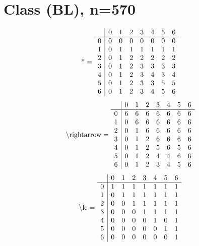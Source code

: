 \documentclass[11pt]{article}
\begin{document}
\section{Class (BL), n=570}
\[\text{*} = 
\begin{array}{r | r r r r r r r}
 & 0 & 1 & 2 & 3 & 4 & 5 & 6 \\ \hline
0 & 0 & 0 & 0 & 0 & 0 & 0 & 0 \\
1 & 0 & 1 & 1 & 1 & 1 & 1 & 1 \\
2 & 0 & 1 & 2 & 2 & 2 & 2 & 2 \\
3 & 0 & 1 & 2 & 3 & 3 & 3 & 3 \\
4 & 0 & 1 & 2 & 3 & 4 & 3 & 4 \\
5 & 0 & 1 & 2 & 3 & 3 & 5 & 5 \\
6 & 0 & 1 & 2 & 3 & 4 & 5 & 6 \\
\end{array}
\]
\[\text{\textbackslash rightarrow} = 
\begin{array}{r | r r r r r r r}
 & 0 & 1 & 2 & 3 & 4 & 5 & 6 \\ \hline
0 & 6 & 6 & 6 & 6 & 6 & 6 & 6 \\
1 & 0 & 6 & 6 & 6 & 6 & 6 & 6 \\
2 & 0 & 1 & 6 & 6 & 6 & 6 & 6 \\
3 & 0 & 1 & 2 & 6 & 6 & 6 & 6 \\
4 & 0 & 1 & 2 & 5 & 6 & 5 & 6 \\
5 & 0 & 1 & 2 & 4 & 4 & 6 & 6 \\
6 & 0 & 1 & 2 & 3 & 4 & 5 & 6 \\
\end{array}
\]
\[\text{\textbackslash le} = 
\begin{array}{r | r r r r r r r}
 & 0 & 1 & 2 & 3 & 4 & 5 & 6 \\ \hline
0 & 1 & 1 & 1 & 1 & 1 & 1 & 1 \\
1 & 0 & 1 & 1 & 1 & 1 & 1 & 1 \\
2 & 0 & 0 & 1 & 1 & 1 & 1 & 1 \\
3 & 0 & 0 & 0 & 1 & 1 & 1 & 1 \\
4 & 0 & 0 & 0 & 0 & 1 & 0 & 1 \\
5 & 0 & 0 & 0 & 0 & 0 & 1 & 1 \\
6 & 0 & 0 & 0 & 0 & 0 & 0 & 1 \\
\end{array}
\]
\end{document}
